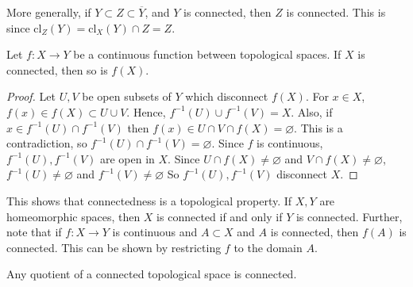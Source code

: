 \begin{remark}
	More generally, if \( Y \subset Z \subset \overline Y \), and \( Y \) is connected, then \( Z \) is connected.
	This is since \( \mathrm{cl}_Z(Y) = \mathrm{cl}_X(Y) \cap Z = Z \).
\end{remark}
\begin{theorem}
	Let \( f \colon X \to Y \) be a continuous function between topological spaces.
	If \( X \) is connected, then so is \( f(X) \).
\end{theorem}
\begin{proof}
	Let \( U, V \) be open subsets of \( Y \) which disconnect \( f(X) \).
	For \( x \in X \), \( f(x) \in f(X) \subset U \cup V \).
	Hence, \( f^{-1}(U) \cup f^{-1}(V) = X \).
	Also, if \( x \in f^{-1}(U) \cap f^{-1}(V) \) then \( f(x) \in U \cap V \cap f(X) = \varnothing \).
	This is a contradiction, so \( f^{-1}(U) \cap f^{-1}(V) = \varnothing \).
	Since \( f \) is continuous, \( f^{-1}(U), f^{-1}(V) \) are open in \( X \).
	Since \( U \cap f(X) \neq \varnothing \) and \( V \cap f(X) \neq \varnothing \), \( f^{-1}(U) \neq \varnothing \) and \( f^{-1}(V) \neq \varnothing \)
	So \( f^{-1}(U), f^{-1}(V) \) disconnect \( X \).
\end{proof}
\begin{remark}
	This shows that connectedness is a topological property.
	If \( X, Y \) are homeomorphic spaces, then \( X \) is connected if and only if \( Y \) is connected.
	Further, note that if \( f \colon X \to Y \) is continuous and \( A \subset X \) and \( A \) is connected, then \( f(A) \) is connected.
	This can be shown by restricting \( f \) to the domain \( A \).
\end{remark}
\begin{corollary}
	Any quotient of a connected topological space is connected.
\end{corollary}
